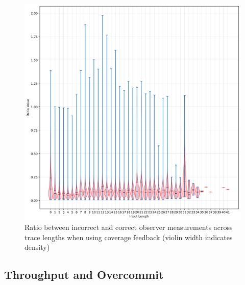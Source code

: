 \documentclass[twocolumn]{article}
\begin{document}
\begin{figure}
  \includegraphics[width=\columnwidth]{assets/consistency/coverage-violin.png}
  \caption{Ratio between incorrect and correct observer measurements across trace lengths when using coverage feedback (violin width indicates density)}
  \label{fig:coverage-inter-violin}
\end{figure}

\subsection{Throughput and Overcommit}
\label{Results:Overcommit}
\end{document}
